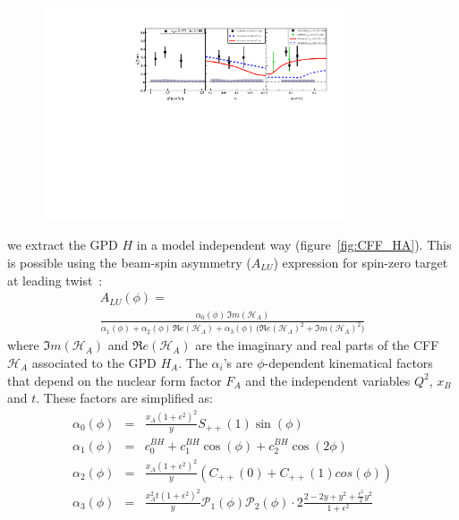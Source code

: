 \documentclass[nofootinbib,twocolumn,showpacs,prl,superscriptaddress,secnumarabic,amssymb,nobibnotes,aps,floatfix]{revtex4}
\begin{document}
\begin{figure}[tb]
\includegraphics[width=8.9cm]{figs/coherent-ALU_90.pdf}
\vspace{-0.9cm}
\caption{}
\label{fig:alu90}
\end{figure}

we extract the GPD $H$ in a model independent way (figure~\ref{fig:CFF_HA}).  
This is possible using the beam-spin asymmetry ($A_{LU}$) expression for 
spin-zero target at leading twist~\cite{BM_2009}:
\small
\begin{equation}
\begin{split}
A_{LU}(\phi) =~~~~~~~~~~~~~~~~~~~~~~~~~~~~~~~~~~~~~~~~~~~~~~~~~~~~~~~~~\\
 \frac{\alpha_{0}(\phi) \, \Im m(\mathcal{H}_{A})}
{\alpha_{1}(\phi) + \alpha_{2}(\phi) \, \Re e(\mathcal{H}_{A}) + \alpha_{3}(\phi) \, 
\big( 
\Re e(\mathcal{H}_{A})^{2} + \Im m(\mathcal{H}_{A})^{2} \big)}
\label{eq:A_LU-coh}
\end{split}
\end{equation}
\normalsize
%
where $\Im m(\mathcal{H}_{A})$ and $\Re e(\mathcal{H}_{A})$ are the imaginary and real parts of the CFF $\mathcal{H}_{A}$ associated to the GPD $H_A$. The $\alpha_{i}$'s are $\phi$-dependent kinematical factors that depend on the nuclear form factor $F_A$ and the independent variables $Q^2$, $x_{B}$ and $t$. These factors are simplified as:
%
\small
\begin{eqnarray}
   \alpha_0 (\phi) & = &\frac{x_{A}(1+\epsilon^2)^2}{y} S_{++}(1) \sin(\phi)\\
    \alpha_1 (\phi) & = & c_0^{BH}+c_1^{BH} \cos({\phi})+c_2^{BH} \cos(2\phi)\\ 
   \alpha_2 (\phi) & = & \frac{x_{A}(1+\epsilon^2)^2}{y}  \left( C_{++}(0) +  
C_{++}(1) cos(\phi) \right)\\
\alpha_3 (\phi) &=& \frac{x^{2}_{A}t(1+\epsilon^2)^2}{y} {\mathcal P}_1(\phi) 
{\mathcal P}_2(\phi) \cdot 2 \frac{2-2y+y^2 + \frac{\epsilon^2}{2}y^2}{1 + 
\epsilon^2}
\end{eqnarray}
\normalsize
%
\end{document}
